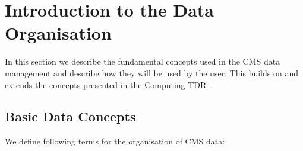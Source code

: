 \documentclass[pdftex]{cmspaper}
\begin{document}
\section{Introduction to the Data Organisation}
\label{sec:dbsconcepts}
  In this section we describe the fundamental concepts used in the CMS
data management and describe how they will be used by the user. This
builds on and extends the concepts presented in the Computing TDR~\cite{CTDR}.

\subsection{Basic Data Concepts}
\label{sec:data}
We define following terms for the organisation of CMS data:
\end{document}
